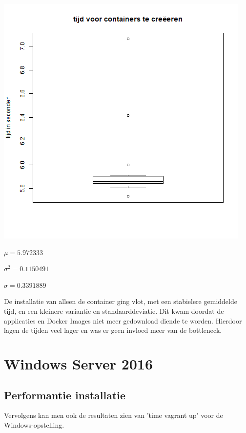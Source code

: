 \begin{center}
	\includegraphics[scale=0.5]{img/centosboxplotprovision.png}
\end{center}

$\mu = 5.972333$

$\sigma^2 = 0.1150491$

$\sigma = 0.3391889$

De installatie van alleen de container ging vlot, met een stabielere gemiddelde tijd, en een kleinere variantie en standaarddeviatie. Dit kwam doordat de applicaties en Docker Images niet meer gedownload diende te worden. Hierdoor lagen de tijden veel lager en was er geen invloed meer van de bottleneck.

\section{Windows Server 2016}
\subsection{Performantie installatie}
Vervolgens kan men ook de resultaten zien van 'time vagrant up' voor de Windows-opstelling.

